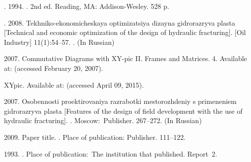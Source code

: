 \documentclass[12pt, twoside]{article}
\begin{document}

\maketitleSecondary
\English
\begin{thebibliography}{99}
	. 1994.
	.
	2nd ed.
	Reading, MA: Addison-Wesley. 528 p.

	. 2008.
	Tekhniko-ekonomicheskaya optimizatsiya dizayna gidrorazryva plasta
	[Technical and economic optimization of the design of hydraulic fracturing].
	 [Oil Industry] 11(1):54--57.
	. (In Russian)

	 2007.
	Commutative Diagrams with XY-pic II. Frames and Matrices.
	  4.
	Available at: 
    (accessed February 20, 2007).

	XYpic.
	Available at: 
	(accessed April 09, 2015).

	 2007.
	Osobennosti proektirovaniya razrabotki mestorozhdeniy s primeneniem gidrorazryva plasta
	[Features of the design of field development with the use of hydraulic fracturing].
	.
	Moscow:~Publisher. 267--272. (In Russian)
	   	
     2009.
    Paper title.
    .
    Place of publication: Publisher. 111--122.
	
	 1993.
  	.
  	Place of publication:~The institution that published.  Report~2.
  	     	
\end{thebibliography}
\end{document}
